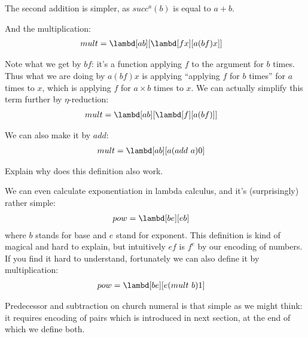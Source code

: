 \documentclass[../../../include/open-logic-section]{subfiles}
\begin{document}
The second addition is simpler, as $succ^a(b)$ is equal to ${a + b}$.

And the multiplication:
\begin{align*}
  {mult} &= \lambd[{a}{b}][\lambd[fx][{a} ({b} f) x]]
\end{align*}

Note what we get by ${b} f$: it's a function applying $f$
to the argument for $b$ times. Thus what we are doing by ${a} ({b} f) x$ is applying ``applying
$f$ for $b$ times'' for $a$ times to $x$, which is applying $f$ for $a
\times b$ times to $x$. We can actually simplify this term further by
$\eta$-reduction:
\begin{align*}
  {mult} &= \lambd[ab][\lambd[f][a (b f)]]
\end{align*}

We can also make it by $add$:
\begin{align*}
  {mult} &= \lambd[ab][a (add ~ a) 0]
\end{align*}

\begin{prob}
  Explain why does this definition also work.
\end{prob}

We can even calculate exponentiation in lambda calculus, and it's
(surprisingly) rather simple:
\begin{align*}
  {pow} &= \lambd[be][e b]
\end{align*}
where $b$ stands for base and $e$ stand for exponent. 
This definition is kind of magical and hard to explain, but
intuitively $e f$ is $f^e$ by our encoding of numbers. If you find it
hard to understand, fortunately we can
also define it by multiplication:
\begin{align*}
  {pow} &= \lambd[be][e ({mult}~ b) 1]
\end{align*}

Predecessor and subtraction on church numeral is that simple as we might think: it
requires encoding of pairs which is introduced in next section,
at the end of which we define both.
\end{document}
